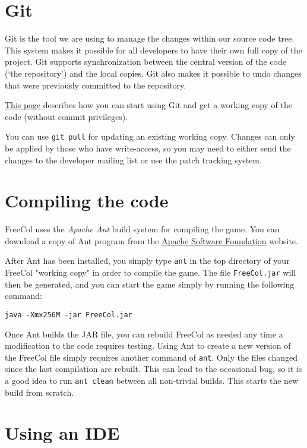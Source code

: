 \documentclass[12pt]{book}
\begin{document}
\hypertarget{Git}{\section{Git}}

Git is the tool we are using to manage the changes within our source
code tree. This system makes it possible for all developers to have
their own full copy of the project. Git supports synchronization
between the central version of the code (`the repository') and the
local copies. Git also makes it possible to undo changes that were
previously committed to the repository.

\href{http://www.freecol.org/documentation/git.html}{This page}
describes how you can start using Git and get a working copy of the
code (without commit privileges).

You can use \verb+git pull+ for updating an existing working
copy. Changes can only be applied by those who have write-access, so
you may need to either send the changes to the developer mailing list
or use the patch tracking system.


\hypertarget{Compiling the code}{\section{Compiling the code}}

FreeCol uses the \textit{Apache Ant} build system for compiling the
game. You can download a copy of Ant program from the
\href{http://ant.apache.org}{Apache Software Foundation} website.

After Ant has been installed, you simply type \verb+ant+ in the top
directory of your FreeCol "working copy" in order to compile the game.
The file \verb+FreeCol.jar+ will then be generated, and you can start
the game simply by running the following command:

\verb+java -Xmx256M -jar FreeCol.jar+

Once Ant builds the JAR file, you can rebuild FreeCol as needed any time
a modification to the code requires testing. Using Ant to create
a new version of the FreeCol file simply requires another command of
\verb+ant+. Only the files changed since the last compilation are rebuilt.
This can lead to the occasional bug, so it is a good idea to run \verb+ant clean+
between all non-trivial builds. This starts the new build from scratch.

\hypertarget{Using an IDE}{\section{Using an IDE}}
\end{document}
